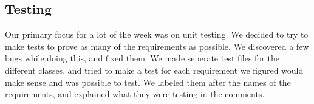 \documentclass[11pt]{article}
\begin{document}
    \subsection*{Testing}
    Our primary focus for a lot of the week was on unit testing. We decided to try to make tests to prove as many of the requirements as possible. 
    We discovered a few bugs while doing this, and fixed them. We made seperate test files for the different classes, and tried to make a test for each requirement we 
    figured would make sense and was possible to test. We labeled them after the names of the requirements, and explained what they were testing in the comments. 
\end{document}
